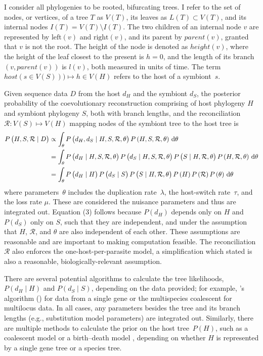 \documentclass[12pt,letterpaper]{article}
\newcommand{\aposcite}[2]{\citeauthor{#1}'s #2 (\citeyear{#1})}
\newcommand{\R}{\ensuremath{\mathcal{R}}}
\begin{document}
I consider all phylogenies to be rooted, bifurcating trees. I refer to the set of nodes, or vertices, of a tree $T$ as $V(T)$, its leaves as $L(T) \subset V(T)$, and its internal nodes $I(T) = V(T) \setminus I(T)$. The two children of an internal node $v$ are represented by $\text{left}(v)$ and $\text{right}(v)$, and its parent by $parent(v)$, granted that $v$ is not the root. The height of the node is denoted as $height(v)$, where the height of the leaf closest to the present is $h = 0$, and the length of its branch $(v,parent(v))$ is $l(v)$, both measured in units of time. The term $host(s \in V(S))) \mapsto h \in V(H)$ refers to the host of a symbiont~$s$.

Given sequence data $D$ from the host $d_H$ and the symbiont $d_S$, the posterior probability of the coevolutionary reconstruction comprising of host phylogeny $H$ and symbiont phylogeny $S$, both with branch lengths, and the reconciliation $\R: V\left(S\right) \mapsto V\left(H\right)$ mapping nodes of the symbiont tree to the host tree is
\begin{align}
P\left(H,S,\R\mid D\right) &\propto \int_\theta P\left(d_H,d_S\mid H,S,\R,\theta\right) P\left(H,S,\R,\theta\right) \, \dif \theta \\
&= \int_\theta P\left(d_H\mid H,S,\R,\theta\right) P\left(d_S\mid H,S,\R,\theta\right) P\left(S\mid H,\R,\theta\right) P\left(H,\R,\theta\right) \, \dif \theta \\
&= \int_\theta P\left(d_H\mid H\right) P\left(d_S\mid S\right)  P\left(S\mid H,\R,\theta\right) P\left(H\right) P\left(\R\right) P\left(\theta\right) \, \dif \theta
\end{align}
where parameters~$\theta$ includes the duplication rate~$\lambda$, the host-switch rate~$\tau$, and the loss rate $\mu$. These are considered the nuisance parameters and thus are integrated out. Equation (3) follows because $P\left(d_H\right)$ depends only on $H$ and $P\left(d_S\right)$ only on $S$, such that they are independent, and under the assumption that $H$, $\R$, and $\theta$ are also independent of each other. These assumptions are reasonable and are important to making computation feasible. The reconciliation $\R$ also enforces the one-host-per-parasite model, a simplification which \textcite{Ronquist:2003} stated is also a reasonable, biologically-relevant assumption.

There are several potential algorithms to calculate the tree likelihoods, $P\left(d_H\mid H\right)$ and $P\left(d_S\mid S\right)$, depending on the data provided; for example, \aposcite{Felsenstein:1981}{algorithm} for data from a single gene or the multispecies coalescent \parencite{Heled:2010a} for multilocus data. In all cases, any parameters besides the tree and its branch lengths (e.g., substitution model parameters) are integrated out. Similarly, there are multiple methods to calculate the prior on the host tree~$P\left(H\right)$, such as a coalescent model \parencite{Kingman:1982} or a birth--death model \parencite{Gernhard:2008}, depending on whether $H$ is represented by a single gene tree or a species tree.
\end{document}
